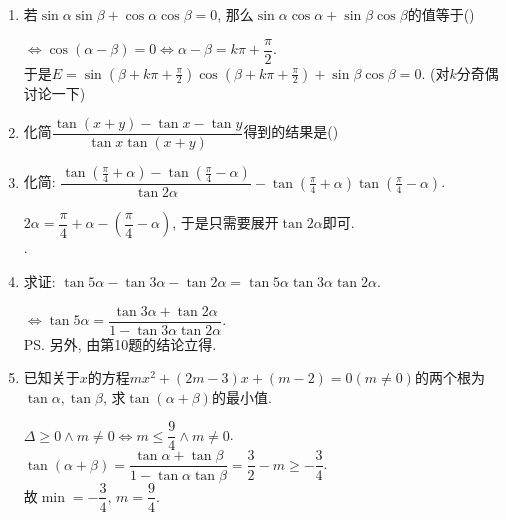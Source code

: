\begin{enumerate}
\item 若$\sin\alpha\sin\beta+\cos\alpha\cos\beta=0$, 那么$\sin\alpha\cos\alpha+\sin\beta\cos\beta$的值等于\dotfill()
\begin{jieda}
$\iff\cos(\alpha-\beta)=0\iff\alpha-\beta=k\pi+\dfrac{\pi}{2}$. \\
于是$E=\sin(\beta+k\pi+\frac{\pi}{2})\cos(\beta+k\pi+\frac{\pi}{2})+\sin\beta\cos\beta=0$. (对$k$分奇偶讨论一下)
\end{jieda}

\item 化简$\dfrac{\tan(x+y)-\tan{x}-\tan{y}}{\tan{x}\tan(x+y)}$得到的结果是\dotfill()

\item 化简: $\dfrac{\tan(\frac{\pi}{4}+\alpha)-\tan(\frac{\pi}{4}-\alpha)}{\tan2\alpha}-\tan(\frac{\pi}{4}+\alpha)\tan(\frac{\pi}{4}-\alpha)$. 
\begin{jieda}
$2\alpha=\dfrac{\pi}{4}+\alpha-\left(\dfrac{\pi}{4}-\alpha\right)$, 于是只需要展开$\tan2\alpha$即可. \\
. 
\end{jieda}

\item 求证: $\tan5\alpha-\tan3\alpha-\tan2\alpha=\tan5\alpha\tan3\alpha\tan2\alpha$. 
\begin{jieda}
$\iff \tan5\alpha=\dfrac{\tan3\alpha+\tan2\alpha}{1-\tan3\alpha\tan2\alpha}$. \\
\ps 另外, 由第10题的结论立得. 
\end{jieda}


\item 已知关于$x$的方程$mx^2+(2m-3)x+(m-2)=0(m\neq 0)$的两个根为$\tan\alpha,\tan\beta$, 求$\tan(\alpha+\beta)$的最小值.
\begin{jieda}
$\Delta\geq 0\land m\neq 0\iff m\leq\dfrac{9}{4}\land m\neq 0$. \\
$\tan(\alpha+\beta)=\dfrac{\tan\alpha+\tan\beta}{1-\tan\alpha\tan\beta}=\dfrac{3}{2}-m\geq-\dfrac{3}{4}$. \\
故$\min=-\dfrac{3}{4}$, $m=\dfrac{9}{4}$. 
\end{jieda}


\end{enumerate}
